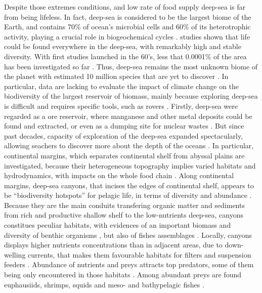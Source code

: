 Despite those extremes conditions, and low rate of food supply deep-sea is far from being lifeless. In fact, deep-sea is considered to be the largest biome of the Earth, and contains 70\% of ocean's microbial cells and 60\% of its heterotrophic activity, playing a crucial role in biogeochemical cycles \citep{salazar2016}. \citet{grassle1992,parkes1994,todo2005} studies shown that life could be found everywhere in the deep-sea, with remarkably high and stable diversity. With first studies launched in the 60's, less that 0.0001\% of the area has been investigated so far \citep{danovaro2017}. Thus, deep-sea remains the most unknown biome of the planet with estimated 10 million species that are yet to discover \citep{danovaro2017,grassle1992}. In particular, data are lacking to evaluate the impact of climate change on the biodiversity of the largest reservoir of biomass, mainly because exploring deep-sea is difficult and requires specific tools, such as rovers \citep{danovaro2008,danovaro2014}. Firstly, deep-sea were regarded as a ore reservoir, where manganese and other metal deposits could be found and extracted, or even as a dumping site for nuclear wastes \citep{baker2020,gillet2013,halfar2002}. But since past decades, capacity of exploration of the deep-sea expanded spectacularly, allowing seachers to discover more about the depth of the oceans \citep{danovaro2014}.
In particular, continental margins, which separates continental shelf from abyssal plains are investigated, because their heterogeneous topography implies varied habitats and hydrodynamics, with impacts on the whole food chain \citep{danovaro2009}. Along continental margins, deep-sea canyons, that incises the edges of continental shelf, appears to be ``biodiversity hotspots'' for pelagic life, in terms of diversity and abundance \citep{aissi2012,danovaro2009,gillet2013,robertson2020}. Because they are the main conduits transfering organic matter and sediments from rich and productive shallow shelf to the low-nutrients deep-sea, canyons constitues peculiar habitats, with evidences of an important biomass and diversity of benthic organisms \citep{canals2006,danovaro2009,leo2012}, but also of fishes assemblages \citep{sion2019,stefanescu1994}. Locally, canyons displays higher nutrients concentrations than in adjacent areas, due to down-welling currents, that makes them favourable habitats for filters and suspension feeders \citep{sion2019}. Abundance of nutrients and preys attracts top predators, some of them being only encountered in those habitats \citep{aissi2012}. Among abundant preys are found euphausiids, shrimps, squids and meso- and bathypelagic fishes \citep{aissi2012,gaskett2001}.

